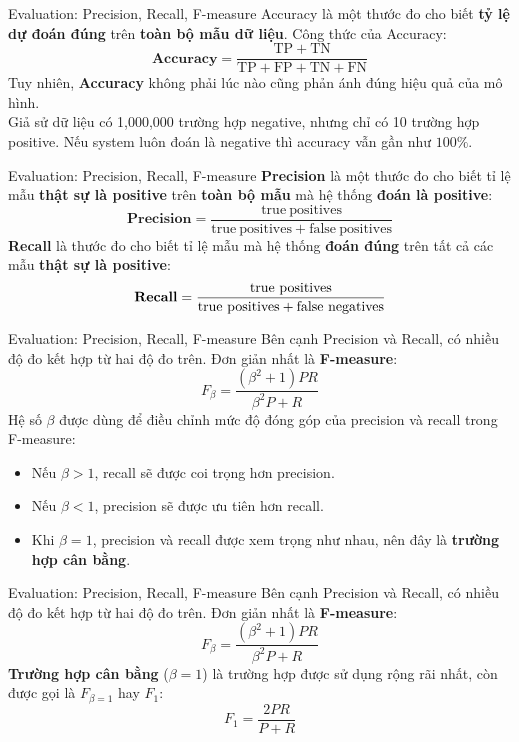 \begin{frame}{Evaluation: Precision, Recall, F-measure}
	Accuracy là một thước đo cho biết \textbf{tỷ lệ dự đoán đúng} trên \textbf{toàn bộ mẫu dữ liệu}. Công thức của Accuracy:
	\[
	\mathrm{\textbf{Accuracy}}=\frac{\mathrm{TP}+\mathrm{TN}}{\mathrm{TP}+\mathrm{FP}+\mathrm{TN}+\mathrm{FN}}
	\]
	\pause 
	Tuy nhiên, \textbf{Accuracy} không phải lúc nào cũng phản ánh đúng hiệu quả của mô hình. \\[0.1cm]
	Giả sử dữ liệu có 1,000,000 trường hợp negative, nhưng chỉ có 10 trường hợp positive. Nếu system luôn đoán là negative thì accuracy vẫn gần như $100\%$. 
\end{frame}

\begin{frame}{Evaluation: Precision, Recall, F-measure}
	\textbf{Precision} là một thước đo cho biết tỉ lệ mẫu \textbf{thật sự là positive} trên \textbf{toàn bộ mẫu} mà hệ thống \textbf{đoán là positive}:
	\[
	\mathrm{\textbf{Precision}}=\frac{\mathrm{true\ positives}}{\mathrm{true\ positives}+\mathrm{false\ positives}}
	\]
	\pause
	\textbf{Recall} là thước đo cho biết tỉ lệ mẫu mà hệ thống \textbf{đoán đúng} trên tất cả các mẫu \textbf{thật sự là positive}:
	\[
	\text{\textbf{Recall}} = \frac{\mathrm{true\ positives}}{\mathrm{true\ positives} + \mathrm{false\ negatives}}
	\]
\end{frame}

\begin{frame}{Evaluation: Precision, Recall, F-measure}
Bên cạnh Precision và Recall, có nhiều độ đo kết hợp từ hai độ đo trên. Đơn giản nhất là \textbf{F-measure}:
\[
F_{\beta} = \frac{(\beta^2 + 1)PR}{\beta^2 P + R}
\]
Hệ số $\beta$ được dùng để điều chỉnh mức độ đóng góp của precision và recall trong F-measure:
\pause
\begin{itemize}
	\item Nếu $\beta > 1$, recall sẽ được coi trọng hơn precision. 
	\item Nếu $\beta < 1$, precision sẽ được ưu tiên hơn recall.
	\item Khi $\beta = 1$, precision và recall được xem trọng như nhau, nên đây là \textbf{trường hợp cân bằng}.
\end{itemize}

\end{frame}

\begin{frame}{Evaluation: Precision, Recall, F-measure}
Bên cạnh Precision và Recall, có nhiều độ đo kết hợp từ hai độ đo trên. Đơn giản nhất là \textbf{F-measure}:
\[
F_{\beta} = \frac{(\beta^2 + 1)PR}{\beta^2 P + R}
\]
	\textbf{Trường hợp cân bằng} ($\beta = 1$) là trường hợp được sử dụng rộng rãi nhất, còn được gọi là $F_{\beta=1}$ hay $F_1$: 
	\begin{equation}
		F_1 = \frac{2PR}{P + R}
		\tag{4.42}
	\end{equation}
\end{frame}

